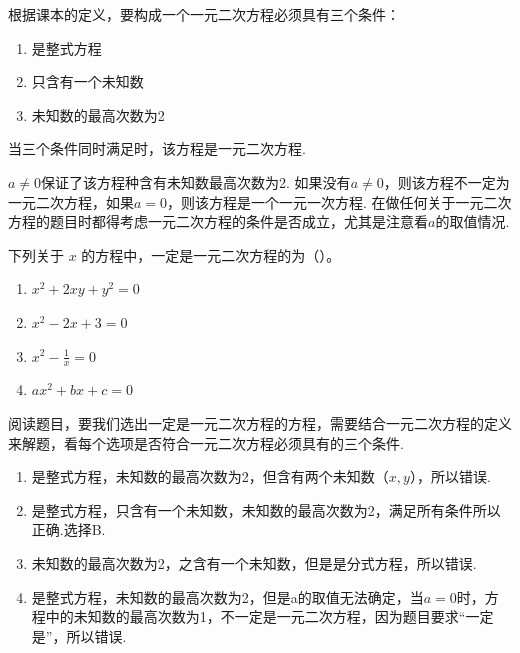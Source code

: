 \documentclass[lang=cn, 10pt, titlestyle=hang]{elegantbook}
\begin{document}
根据课本的定义，要构成一个一元二次方程必须具有三个条件：
\begin{enumerate}
    \item 是整式方程
    \item 只含有一个未知数
    \item 未知数的最高次数为2
\end{enumerate}
\par
当三个条件同时满足时，该方程是一元二次方程.\\
\begin{remark}
    \(a\ne 0\)保证了该方程种含有未知数最高次数为2. 如果没有\(a\ne 0\)，则该方程不一定为一元二次方程，如果\(a= 0\)，则该方程是一个一元一次方程. 在做任何关于一元二次方程的题目时都得考虑一元二次方程的条件是否成立，尤其是注意看\(a\)的取值情况.
\end{remark}
\begin{example}
    下列关于 \( x \) 的方程中，一定是一元二次方程的为（{\hspace{3.5em}}）。
    \begin{enumerate}[label=\Alph*.]
        \item \( x^2 + 2xy + y^2 = 0 \)
        \item \( x^2 - 2x + 3 = 0 \)
        \item \( x^2 - \frac{1}{x} = 0 \)
        \item \( ax^2 + bx + c = 0 \)
    \end{enumerate}
\end{example}



\begin{solution}
    阅读题目，要我们选出一定是一元二次方程的方程，需要结合一元二次方程的定义来解题，看每个选项是否符合一元二次方程必须具有的三个条件.
    \begin{enumerate}[label=\Alph*.]
        \item 是整式方程，未知数的最高次数为2，但含有两个未知数（\(x,y\)），所以错误.
        \item 是整式方程，只含有一个未知数，未知数的最高次数为2，满足所有条件所以正确.选择B.
        \item 未知数的最高次数为2，之含有一个未知数，但是是分式方程，所以错误.
        \item 是整式方程，未知数的最高次数为2，但是a的取值无法确定，当\(a=0\)时，方程中的未知数的最高次数为1，不一定是一元二次方程，因为题目要求“一定是”，所以错误.
    \end{enumerate}
\end{solution}
\end{document}
